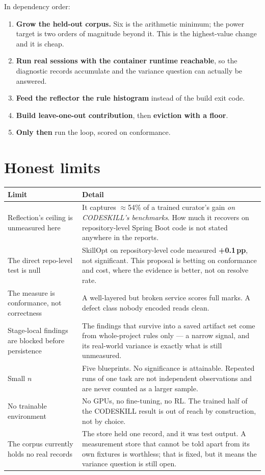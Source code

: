 \documentclass[11pt,a4paper]{article}
\begin{document}
In dependency order:

\begin{enumerate}[leftmargin=1.4em]
  \item \textbf{Grow the held-out corpus.} Six is the arithmetic minimum; the power
  target is two orders of magnitude beyond it. This is the highest-value change and
  it is cheap.
  \item \textbf{Run real sessions with the container runtime reachable}, so the
  diagnostic records accumulate and the variance question can actually be answered.
  \item \textbf{Feed the reflector the rule histogram} instead of the build exit
  code.
  \item \textbf{Build leave-one-out contribution}, then \textbf{eviction with a
  floor}.
  \item \textbf{Only then} run the loop, scored on conformance.
\end{enumerate}

\section{Honest limits}
\label{sec:limits}

\begin{center}
\begin{tabular}{@{}p{}p{}@{}}
\toprule
\textbf{Limit} & \textbf{Detail} \\
\midrule
Reflection's ceiling is unmeasured here & It captures $\approx$54\% of a trained
curator's gain \emph{on CODESKILL's benchmarks}. How much it recovers on repository-level
Spring Boot code is not stated anywhere in the reports. \\
The direct repo-level test is null & SkillOpt on repository-level code measured
\textbf{+0.1\,pp}, not significant. This proposal is betting on conformance and
cost, where the evidence is better, not on resolve rate. \\
The measure is conformance, not correctness & A well-layered but broken service
scores full marks. A defect class nobody encoded reads clean. \\
Stage-local findings are blocked before persistence & The findings that survive
into a saved artifact set come from whole-project rules only --- a narrow signal,
and its real-world variance is exactly what is still unmeasured. \\
Small $n$ & Five blueprints. No significance is attainable. Repeated runs of one
task are not independent observations and are never counted as a larger sample. \\
No trainable environment & No GPUs, no fine-tuning, no RL. The trained half of the
CODESKILL result is out of reach by construction, not by choice. \\
The corpus currently holds no real records & The store held one record, and it was
test output. A measurement store that cannot be told apart from its own fixtures is
worthless; that is fixed, but it means the variance question is still open. \\
\bottomrule
\end{tabular}
\end{center}
\end{document}
